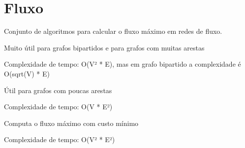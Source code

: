 \documentclass[11pt, a4paper, oneside]{book}
\begin{document}
\hfill

\section{Fluxo}


Conjunto de algoritmos para calcular o fluxo máximo em redes de fluxo.



\textbf{} 


Muito útil para grafos bipartidos e para grafos com muitas arestas



Complexidade de tempo: O(V² * E), mas em grafo bipartido a complexidade é O(sqrt(V) * E)



\textbf{} 


Útil para grafos com poucas arestas



Complexidade de tempo: O(V * E²)



\textbf{} 


Computa o fluxo máximo com custo mínimo



Complexidade de tempo: O(V² * E²)

\hfill
\end{document}
